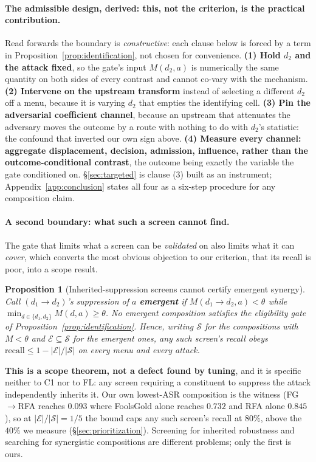 \documentclass{article}
\newtheorem{proposition}{Proposition}
\begin{document}
\paragraph{The admissible design, derived: this, not the criterion, is the practical contribution.} Read forwards the boundary is \emph{constructive}: each clause below is forced by a term in Proposition~\ref{prop:identification}, not chosen for convenience. \textbf{(1) Hold $d_2$ and the attack fixed}, so the gate's input $M(d_2,a)$ is numerically the same quantity on both sides of every contrast and cannot co-vary with the mechanism. \textbf{(2) Intervene on the upstream transform} instead of selecting a different $d_2$ off a menu, because it is varying $d_2$ that empties the identifying cell. \textbf{(3) Pin the adversarial coefficient channel}, because an upstream that attenuates the adversary moves the outcome by a route with nothing to do with $d_2$'s statistic: the confound that inverted our own sign above. \textbf{(4) Measure every channel: aggregate displacement, decision, admission, influence, rather than the outcome-conditional contrast}, the outcome being exactly the variable the gate conditioned on. \S\ref{sec:targeted} is clause (3) built as an instrument; Appendix~\ref{app:conclusion} states all four as a six-step procedure for any composition claim.

\paragraph{A second boundary: what such a screen cannot find.} The gate that limits what a screen can be \emph{validated} on also limits what it can \emph{cover}, which converts the most obvious objection to our criterion, that its recall is poor, into a scope result.

\begin{proposition}[Inherited-suppression screens cannot certify emergent synergy]
\label{prop:emergent}
Call $(d_1 \to d_2)$'s suppression of $a$ \textbf{emergent} if $M(d_1 \to d_2, a) < \theta$ while $\min_{d \in \{d_1,d_2\}} M(d,a) \ge \theta$. No emergent composition satisfies the eligibility gate of Proposition~\ref{prop:identification}. Hence, writing $\mathcal{S}$ for the compositions with $M < \theta$ and $\mathcal{E} \subseteq \mathcal{S}$ for the emergent ones, any such screen's recall obeys $\mathrm{recall} \le 1 - |\mathcal{E}|/|\mathcal{S}|$ on every menu and every attack.
\end{proposition}

\noindent \textbf{This is a scope theorem, not a defect found by tuning}, and it is specific neither to C1 nor to FL: any screen requiring a constituent to suppress the attack independently inherits it. Our own lowest-ASR composition is the witness (FG$\to$RFA reaches $0.093$ where FoolsGold alone reaches $0.732$ and RFA alone $0.845$), so at $|\mathcal{E}|/|\mathcal{S}| = 1/5$ the bound caps any such screen's recall at $80\%$, above the $40\%$ we measure (\S\ref{sec:prioritization}). Screening for inherited robustness and searching for synergistic compositions are different problems; only the first is ours.
\end{document}
